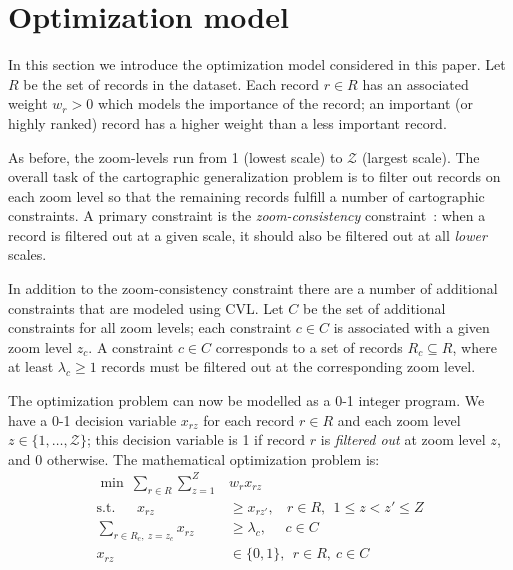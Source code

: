 \section{Optimization model}
\label{sec:optimizationmodel}

In this section we introduce the optimization model considered in this paper. Let $R$ be the set of records in the dataset. Each record $r \in R$ has an associated weight $w_r > 0$ which models the importance of the record; an important (or highly ranked) record has a higher weight than a less important record.

As before, the zoom-levels run from 1 (lowest scale) to $\mathcal{Z}$ (largest scale). The overall task of the cartographic generalization problem is to filter out records on each zoom level so that the remaining records fulfill a number of cartographic constraints. A primary constraint is the \emph{zoom-consistency} constraint~\cite{fusiontables}: when a record is filtered out at a given scale, it should also be filtered out at all \emph{lower} scales. 

In addition to the zoom-consistency constraint there are a number of additional constraints that are modeled using CVL. Let $C$ be the set of additional constraints for all zoom levels; each constraint $c \in C$ is associated with a given zoom level $z_c$. A constraint $c \in C$ corresponds to a set of records $R_c \subseteq R$, where at least $\lambda_c \geq 1$ records must be filtered out at the corresponding zoom level. 

The optimization problem can now be modelled as a 0-1 integer program. We have a 0-1 decision variable $x_{rz}$ for each record $r \in R$ and each zoom level $z \in \{1,\ldots, \mathcal{Z}\}$; this decision variable is 1 if record $r$ is \emph{filtered out} at zoom level $z$, and 0 otherwise. The mathematical optimization problem is:
\begin{align}
  \label{eq:objective}
  \min ~\sum_{r \in R} \sum_{z=1}^Z &w_r x_{rz} \\
  \label{eq:zoom-consistency}
  \mbox{s.t.}~~~~~~~x_{rz} &\geq x_{rz'}, ~~~~r \in R, ~~1 \leq z < z' \leq Z \\
  \label{eq:general-constraints}
  \sum_{r \in R_c, ~z = z_c} x_{rz} &\geq \lambda_c, ~~~~~~ c \in C \\
  x_{rz} & \in \{0, 1\}, ~~ r \in R, ~c \in C
\end{align}

